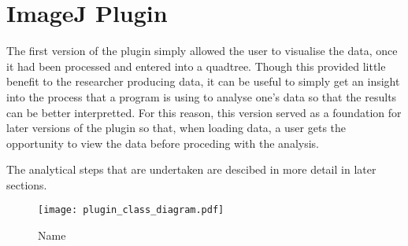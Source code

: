 
\section{ImageJ Plugin}
\label{sec:imagej_plugin}

The first version of the plugin simply allowed the user to visualise the data,
once it had been processed and entered into a quadtree. Though this provided
little benefit to the researcher producing data, it can be useful to simply get
an insight into the process that a program is using to analyse one's data so
that the results can be better interpretted. For this reason, this version
served as a foundation for later versions of the plugin so that, when loading
data, a user gets the opportunity to view the data before proceding with the
analysis.

The analytical steps that are undertaken are descibed in more detail in later
sections.

\begin{figure}[htpb]
	\centering
	\texttt{[image: plugin\_class\_diagram.pdf]}
	\caption{Name}
	\label{fig:name}
\end{figure}
